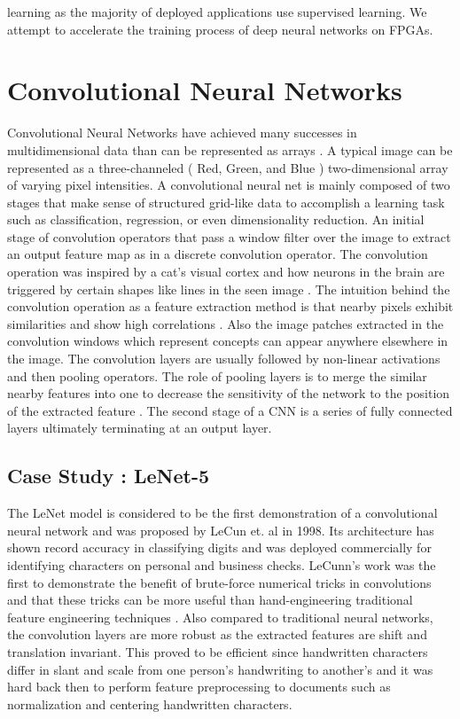 learning as the majority of deployed applications use supervised learning. We attempt to accelerate the training process of deep neural networks on FPGAs. 

\section{Convolutional Neural Networks}

Convolutional Neural Networks have achieved many successes in multidimensional data than can be represented as arrays \cite{lenet, alexnet, resnet}. A typical image can be represented as a three-channeled ( Red, Green, and Blue ) two-dimensional array of varying pixel intensities. A convolutional neural net is mainly composed of two stages that make sense of structured grid-like data to accomplish a learning task such as classification, regression, or even dimensionality reduction. An initial stage of convolution operators that pass a window filter over the image to extract an output feature map as in a discrete convolution operator. The convolution operation was inspired by a cat’s visual cortex and how neurons in the brain are triggered by certain shapes like lines in the seen image \cite{hubel1962receptive}. The intuition behind the convolution operation as a feature extraction method is that nearby pixels exhibit similarities and show high correlations \cite{lavin2016fast}. Also the image patches extracted in the convolution windows which represent concepts can appear anywhere elsewhere in the image. The convolution layers are usually followed by non-linear activations and then pooling operators. The role of pooling layers is to merge the similar nearby features into one to decrease the sensitivity of the network to the position of the extracted feature \cite{szegedy2015going}. The second stage of a CNN is a series of fully connected layers ultimately terminating at an output layer.

\subsection{Case Study : LeNet-5}
The LeNet \cite{lenet} model is considered to be the first demonstration of a convolutional neural network and was proposed by LeCun et. al \cite{lenet} in 1998. Its architecture has shown record accuracy in classifying digits and was deployed commercially for identifying characters on personal and business checks. LeCunn’s work was the first to demonstrate the benefit of brute-force numerical tricks in convolutions and that these tricks can be more useful than hand-engineering traditional feature engineering techniques \cite{lenet}. Also compared to traditional neural networks, the convolution layers are more robust as the extracted features are shift and translation invariant. This proved to be efficient since handwritten characters differ in slant and scale from one person’s handwriting to another’s and it was hard back then to perform feature preprocessing to documents such as normalization and centering handwritten characters.

